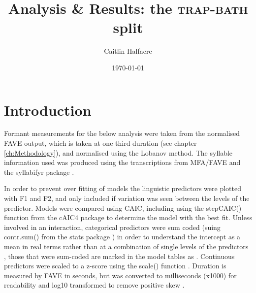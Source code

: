 \documentclass[../../00.FullDoc/tex/Thesis]{subfiles}
\title{Analysis \& Results: the \textsc{trap}-\textsc{bath} split}
\author{Caitlin Halfacre}
\date{\today}
\begin{document}
	
	\renewcommand{\onlyinsubfile}[1]{}
	\renewcommand{\notinsubfile}[1]{#1}
	\maketitle
	\pagebreak
	\tableofcontents
	\onehalfspacing
	\pagestyle{scrheadings}
	
\section{Introduction}
Formant measurements for the below analysis were taken from the normalised FAVE \citep{FAVE} output, which is taken at one third duration (see chapter \onlyinsubfile{5}\notinsubfile{\ref{ch:Methodology}}), and normalised using the Lobanov method. The syllable information used was produced using the transcriptions from MFA/FAVE and the syllabifyr package \citep{syllabifyr}.

In order to prevent over fitting of models the linguistic predictors were plotted with F1 and F2, and only included if variation was seen between the levels of the predictor. Models were compared using CAIC, including using the stepCAIC() function from the cAIC4 package \citep{cAIC4} to determine the model with the best fit. Unless involved in an interaction, categorical predictors were sum coded (suing contr.sum() from the stats package \citealt{RCoreTeam2021}) in order to understand the intercept as a mean in real terms rather than at a combination of single levels of the predictors \cite{Winter2019}, those that were sum-coded are marked in the model tables as . Continuous predictors were scaled to a z-score using the scale() function \citep{RCoreTeam2021}. Duration is measured by FAVE in seconds, but was converted to milliseconds (x1000) for readability and log10 transformed to remove positive skew \citep{Winter2019}.
\end{document}
